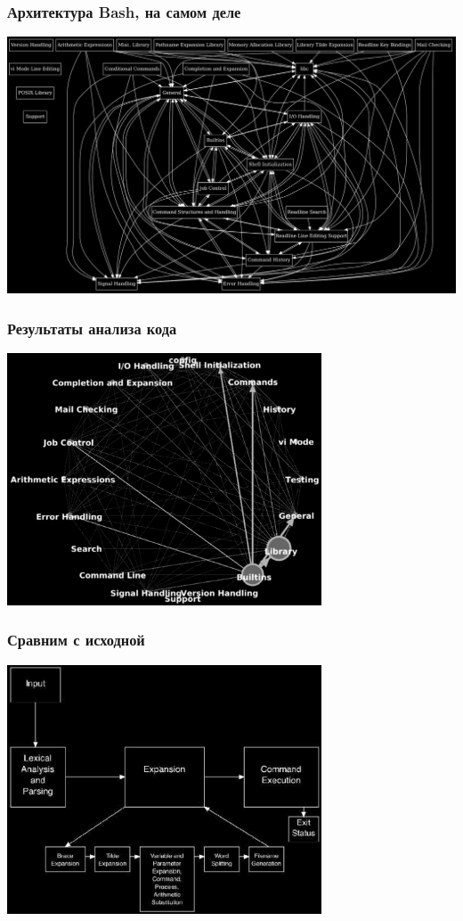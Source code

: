 \documentclass{../cscslides}
\begin{document}
    \begin{frame}
        \frametitle{Архитектура Bash, на самом деле}
        \begin{center}
            \includegraphics[width=\textwidth]{bashRealArchitectureBlack.png}
        \end{center}
    \end{frame}

    \begin{frame}
        \frametitle{Результаты анализа кода}
        \begin{center}
            \includegraphics[width=0.7\textwidth]{bashAutomaticRecoveryArchitectureBlack.png}
        \end{center}
    \end{frame}

    \begin{frame}
        \frametitle{Сравним с исходной}
        \begin{center}
            \includegraphics[width=0.7\textwidth]{bashArchitectureBlack.png}
        \end{center}
    \end{frame}
\end{document}
